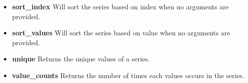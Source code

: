 \begin{itemize}
  \item \textbf{sort\_index} Will sort the series based on index when no
    arguments are provided.

  \item \textbf{sort\_values} Will sort the series based on value when no
    arguments are provided.

  \item \textbf{unique} Returns the unique values of a series.

  \item \textbf{value\_counts} Returns the number of times each values occurs
    in the series.
\end{itemize}

